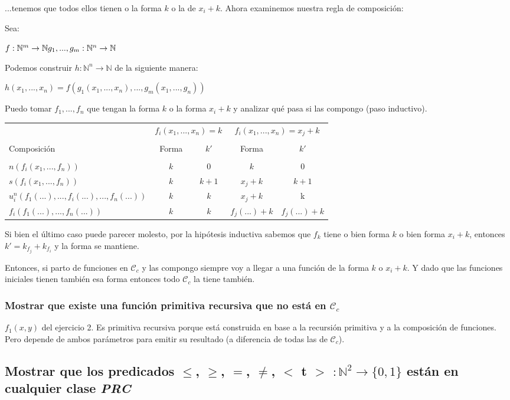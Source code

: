 \documentclass[11pt]{article} %
\newlength{\desarrollolen}
\newcommand{\desarrollo}[2][3em]{

    \hspace{2em}
    \addtolength{\desarrollolen}{-#1}
    \begin{minipage}{\desarrollolen}
        #2
    \end{minipage}
    \addtolength{\desarrollolen}{#1}

}
\newcommand{\nat}{\mathbb{N}}
\newcommand{\Ccur}{\mathcal{C}}
\begin{document}
...tenemos que todos ellos tienen o la forma $k$ o la de $x_i + k$. Ahora examinemos nuestra regla de composición:
\desarrollo{
Sea:
\desarrollo{$
f: \nat^m \to \nat \\
g_1, ..., g_m: \nat^n \to \nat
$}
Podemos construir $h: \nat^n \to \nat$ de la siguiente manera:
\desarrollo{$h(x_1, ..., x_n) = f(g_1(x_1, ..., x_n), ..., g_m(x_1, ..., g_n))$}
}

Puedo tomar $f_1, ..., f_n$ que tengan la forma $k$ o la forma $x_i + k$  y analizar qué pasa si las compongo (paso inductivo).

\desarrollo{
\begin{tabular}{l|c|c|c|c}
& \multicolumn{2}{c|}{$f_i(x_1, ..., x_n) = k$} & \multicolumn{2}{c}{$f_i(x_1, ..., x_n) = x_j + k$} \\ \cline{2-5}
&&&&\\[-1em] 
Composición & Forma &$k'$ & Forma & $k'$ \\ \hline
&&&&\\[-1em]
$n(f_i(x_1,...,f_n))$ & $k$ & $0$ & $k$ & $0$ \\
$s(f_i(x_1,...,f_n))$ & $k$ & $k+1$ & $x_j+k$ & $k+1$ \\
$u^n_i(f_1(...),...,f_i(...),...,f_n(...))$ & $k$ & $k$ & $x_j+k$ & k \\
$f_i(f_1(...),...,f_n(...))$ & $k$ & $k$ & $f_j(...)+k$ & $f_j(...)+k$
\end{tabular}
}

Si bien el último caso puede parecer molesto, por la hipótesis inductiva sabemos que $f_k$ tiene o bien forma $k$ o bien forma $x_i+k$, entonces $k'=k_{f_j}+k_{f_i}$ y la forma se mantiene.

Entonces, si parto de funciones en $\Ccur_c$ y las compongo siempre voy a llegar a una función de la forma $k$ o $x_i+k$. Y dado que las funciones iniciales tienen también esa forma entonces todo $\Ccur_c$ la tiene también.

\subsubsection{Mostrar que existe una función primitiva recursiva que no está en $\Ccur_c$}

$f_1(x,y)$ del ejercicio 2. Es primitiva recursiva porque está construida en base a la recursión primitiva y a la composición de funciones. Pero depende de ambos parámetros para emitir su resultado (a diferencia de todas las de $\Ccur_c$).

\subsection{Mostrar que los predicados $\leq$, $\geq$, $=$, $\neq$, $<$ t $>$ $: \nat^2\to\{0,1\}$ están en cualquier clase \emph{PRC}}
\end{document}
